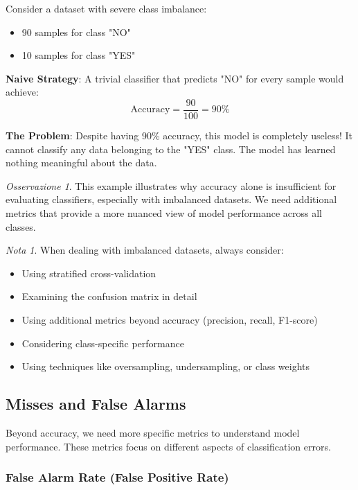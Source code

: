 \documentclass[11pt,a4paper]{article}
\theoremstyle{definition}
\theoremstyle{plain}
\theoremstyle{remark}
\newtheorem*{remark}{Nota}
\newtheorem*{observation}{Osservazione}
\begin{document}
Consider a dataset with severe class imbalance:
\begin{itemize}
    \item 90 samples for class "NO"
    \item 10 samples for class "YES"
\end{itemize}

\textbf{Naive Strategy}: A trivial classifier that predicts "NO" for every sample would achieve:
\[
\text{Accuracy} = \frac{90}{100} = 90\%
\]

\textbf{The Problem}: Despite having 90\% accuracy, this model is completely useless! It cannot classify any data belonging to the "YES" class. The model has learned nothing meaningful about the data.

\begin{observation}
This example illustrates why accuracy alone is insufficient for evaluating classifiers, especially with imbalanced datasets. We need additional metrics that provide a more nuanced view of model performance across all classes.
\end{observation}

\begin{remark}
When dealing with imbalanced datasets, always consider:
\begin{itemize}
    \item Using stratified cross-validation
    \item Examining the confusion matrix in detail
    \item Using additional metrics beyond accuracy (precision, recall, F1-score)
    \item Considering class-specific performance
    \item Using techniques like oversampling, undersampling, or class weights
\end{itemize}
\end{remark}

\subsection{Misses and False Alarms}

Beyond accuracy, we need more specific metrics to understand model performance. These metrics focus on different aspects of classification errors.

\subsubsection{False Alarm Rate (False Positive Rate)}
\end{document}
